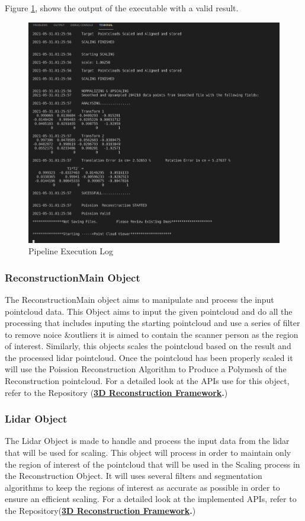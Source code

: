 \documentclass[12pt]{report}
\begin{document}
Figure \ref{fig:pipeline_log}, shows the output of the executable with a valid result.
\enlargethispage{\baselineskip}
\begin{figure}[H]%
  \centering
 \includegraphics[width=1\textwidth]{log.png}
\caption{Pipeline Execution Log}
\label{fig:pipeline_log} 
\end{figure}


\subsubsection*{ReconstructionMain Object}
The ReconstructionMain object aims to manipulate and process the input pointcloud data.
This Object aims to input the given pointcloud and  do all the processing that includes inputing the starting pointcloud and use a series of filter to remove noice \&outliers it is aimed to contain the scanner person as the region of interest. 
Similarly, this objects scales the pointcloud based on the result and the processed lidar pointcloud.
Once the pointcloud has been properly scaled it will use the Poission Reconstruction Algorithm to Produce a Polymesh of the Reconstruction pointcloud.
For a detailed look at the APIs use for this object, refer to the Repository (\textbf{\href{https://github.com/esteban-andrade/3D-Reconstructrion-Scanner} {3D Reconstruction Framework}.})

\subsubsection*{Lidar Object}
The Lidar Object is made to handle and process the input data from the lidar that will be used for scaling. 
This object will process in order to maintain only the region of interest of the pointcloud that will be used in the Scaling process in the Reconstruction Object. 
It will uses several filters and segmentation algorithms to keep the regions of interest as accurate as possible in order to ensure an efficient scaling.
For a detailed look at the implemented APIs, refer to the Repository(\textbf{\href{https://github.com/esteban-andrade/3D-Reconstructrion-Scanner} {3D Reconstruction Framework}.})
\end{document}
